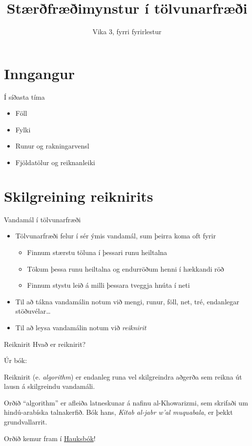 \documentclass{beamer}
\title{Stærðfræðimynstur í tölvunarfræði}
\subtitle{Vika 3, fyrri fyrirlestur}
\begin{document}
\begin{frame}
\titlepage
\end{frame}

\section{Inngangur}

\begin{frame}{Í síðasta tíma}
\begin{itemize}
 \item Föll
 \item Fylki
 \item Runur og rakningarvensl
 \item Fjöldatölur og reiknanleiki
\end{itemize}
\end{frame}

\section{Skilgreining reiknirits}

\begin{frame}{Vandamál í tölvunarfræði}
\begin{itemize}
 \item Tölvunarfræði felur í sér ýmis vandamál, sum þeirra koma oft fyrir
 \begin{itemize}
  \item Finnum stærstu töluna í þessari runu heiltalna
  \item Tökum þessa runu heiltalna og endurröðum henni í hækkandi röð
  \item Finnum stystu leið á milli þessara tveggja hnúta í neti
 \end{itemize}
 \item Til að tákna vandamálin notum við mengi, runur, föll, net, tré, endanlegar stöðuvélar\ldots
 \item Til að leysa vandamálin notum við \emph{reiknirit}
\end{itemize}
\end{frame}

\begin{frame}{Reiknirit}
Hvað er reiknirit? \pause

Úr bók:
\begin{tcolorbox}[title=Reiknirit]
Reiknirit (e. \emph{algorithm}) er endanleg runa vel skilgreindra aðgerða sem reikna út lausn á skilgreindu vandamáli.
\end{tcolorbox}

Orðið ``algorithm'' er afleiða latneskunar á nafinu al-Khowarizmi, sem skrifaði um hindú-arabíska talnakerfið. Bók hans, \emph{Kitab al-jabr w'al muquabala}, er þekkt grundvallarrit.

\pause
Orðið kemur fram í \href{https://en.wikipedia.org/wiki/Hauksb\%C3\%B3k}{Hauksbók}!
\end{frame}
\end{document}
